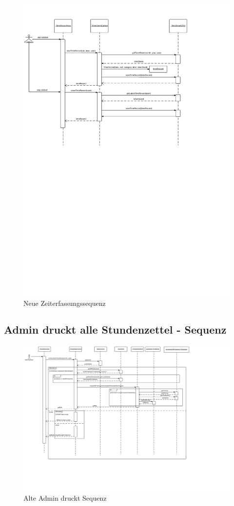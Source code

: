 \begin{figure}
  \centering
    \includegraphics[width=\linewidth]{new-Time-record-new.pdf}
   \caption{Neue Zeiterfassungssequenz}
\end{figure}

\subsection{Admin druckt alle Stundenzettel - Sequenz}

\begin{figure}
  \centering
    \includegraphics[width=\linewidth]{Admin-prints-all-timesheets.pdf}
   \caption{Alte Admin druckt Sequenz}
\end{figure}

